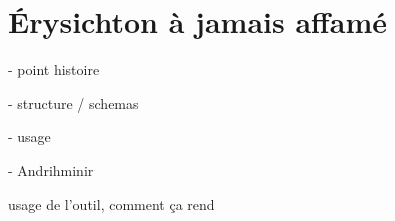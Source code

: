 \chapter{Érysichton à jamais affamé}
\label{chap:erysichtonUsage}


- point histoire

- structure / schemas

- usage

- Andrihminir

usage de l'outil, comment ça rend